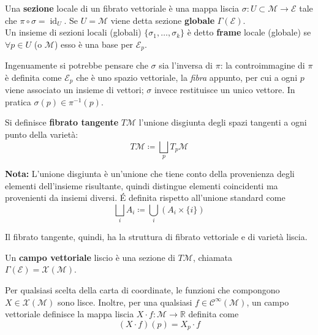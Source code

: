 \begin{definition}
    Una \textbf{sezione} locale di un fibrato vettoriale è una mappa liscia $\sigma : U \subset \mathcal{M} \rightarrow \mathcal{E}$ tale che $\pi \circ \sigma = \operatorname{id}_U$.
    Se $U=\mathcal{M}$ viene detta sezione \textbf{globale} $\Gamma(\mathcal{E})$.\\
    Un insieme di sezioni locali (globali) $\{ \sigma_1, \dots, \sigma_k \}$ è detto \textbf{frame} locale (globale) se $\forall p \in U$ (o $\mathcal{M}$) esso è una base per $\mathcal{E}_p$.
\end{definition}
Ingenuamente si potrebbe pensare che $\sigma$ sia l'inversa di $\pi$: la controimmagine di $\pi$ è definita come $\mathcal{E}_p$ che è uno spazio vettoriale, la \emph{fibra} appunto, per cui a ogni $p$ viene associato un insieme di vettori; $\sigma$ invece restituisce un unico vettore.
In pratica $\sigma(p) \in \pi^{-1}(p)$.

\begin{definition}
    Si definisce \textbf{fibrato tangente} $T\mathcal{M}$ l'unione disgiunta degli spazi tangenti a ogni punto della varietà:
    \begin{equation}
        T\mathcal{M} \coloneqq \bigsqcup_p T_p\mathcal{M}
    \end{equation}
\end{definition}
\textbf{Nota:} L'unione disgiunta è un'unione che tiene conto della provenienza degli elementi dell'insieme risultante, quindi distingue elementi coincidenti ma provenienti da insiemi diversi. \'E definita rispetto all'unione standard come
\[
    \bigsqcup_i A_i \coloneqq \bigcup_i (A_i \times \{ i \} )
\]

Il fibrato tangente, quindi, ha la struttura di fibrato vettoriale e di varietà liscia.
\begin{definition}
    Un \textbf{campo vettoriale} liscio è una sezione di $T\mathcal{M}$, chiamata \\ $\Gamma(\mathcal{E}) = \mathcal{X}(\mathcal{M})$.
\end{definition}
\begin{lemma}
    Per qualsiasi scelta della carta di coordinate, le funzioni che compongono $X \in \mathcal{X}(\mathcal{M})$ sono lisce. Inoltre, per una qualsiasi $f \in \mathcal{C}^\infty(\mathcal{M})$, un campo vettoriale definisce la mappa liscia $X \cdot f : \mathcal{M} \rightarrow \mathbb{R}$ definita come
    \begin{equation}
        (X \cdot f)(p) = X_p \cdot f
    \end{equation}
\end{lemma}

